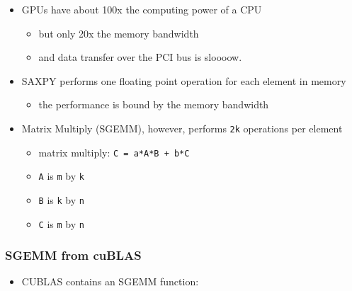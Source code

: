 \begin{itemize}
\itemsep1pt\parskip0pt
\item
  GPUs have about 100x the computing power of a CPU

  \begin{itemize}
  \itemsep1pt\parskip0pt
  \item
    but only 20x the memory bandwidth
  \item
    and data transfer over the PCI bus is sloooow.
  \end{itemize}
\item
  SAXPY performs one floating point operation for each element in memory

  \begin{itemize}
  \itemsep1pt\parskip0pt
  \item
    the performance is bound by the memory bandwidth
  \end{itemize}
\item
  Matrix Multiply (SGEMM), however, performs \texttt{2k} operations per
  element

  \begin{itemize}
  \itemsep1pt\parskip0pt
  \item
    matrix multiply: \texttt{C = a*A*B + b*C}
  \item
    \texttt{A} is \texttt{m} by \texttt{k}
  \item
    \texttt{B} is \texttt{k} by \texttt{n}
  \item
    \texttt{C} is \texttt{m} by \texttt{n}
  \end{itemize}
\end{itemize}

\subsubsection{SGEMM from cuBLAS}\label{sgemm-from-cublas}

\begin{itemize}
\itemsep1pt\parskip0pt
\item
  CUBLAS contains an SGEMM function:
\end{itemize}

